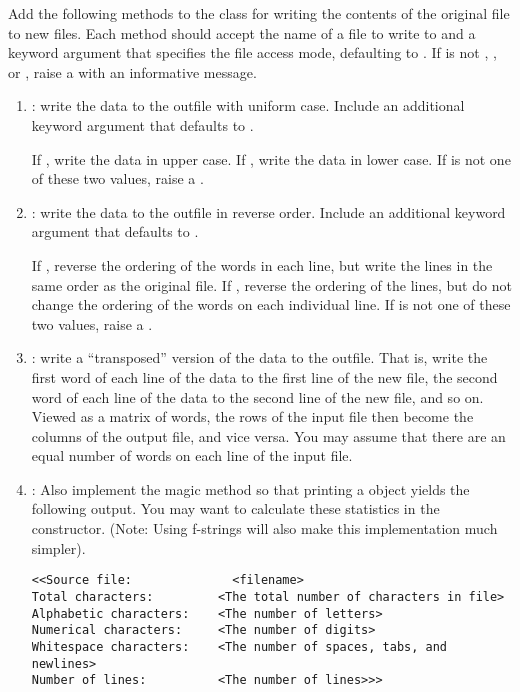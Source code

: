\begin{problem} %
Add the following methods to the  class for writing the contents of the original file to new files.
Each method should accept the name of a file to write to and a keyword argument  that specifies the file access mode, defaulting to .
If  is not , , or , raise a  with an informative message.

\begin{enumerate}
\item {}: write the data to the outfile with uniform case. Include an additional keyword argument  that defaults to .

If , write the data in upper case.
If , write the data in lower case.
If  is not one of these two values, raise a .

\item {}: write the data to the outfile in reverse order. Include an additional keyword argument  that defaults to .

If , reverse the ordering of the words in each line, but write the lines in the same order as the original file.
If , reverse the ordering of the lines, but do not change the ordering of the words on each individual line.
If  is not one of these two values, raise a .

\item {}: write a ``transposed'' version of the data to the outfile.
That is, write the first word of each line of the data to the first line of the new file, the second word of each line of the data to the second line of the new file, and so on.
Viewed as a matrix of words, the rows of the input file then become the columns of the output file, and vice versa.
You may assume that there are an equal number of words on each line of the input file.

\item {}: Also implement the  magic method so that printing a  object yields the following output.
You may want to calculate these statistics in the constructor. (Note: Using f-strings will also make this implementation much simpler).

\begin{lstlisting}
<<Source file:              <filename>
Total characters:         <The total number of characters in file>
Alphabetic characters:    <The number of letters>
Numerical characters:     <The number of digits>
Whitespace characters:    <The number of spaces, tabs, and newlines>
Number of lines:          <The number of lines>>>
\end{lstlisting}


\end{enumerate}
\end{problem}
